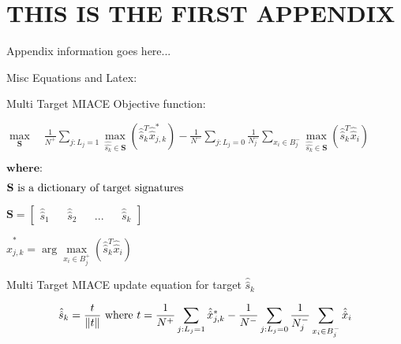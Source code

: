 
\chapter{THIS IS THE FIRST APPENDIX}

Appendix information goes here...

Misc Equations and Latex:\newline
\vspace{5mm}

\textup{Multi Target MIACE Objective function:}

$\underset{\mathbf{S}}{\max} \quad \frac{1}{N^{+}} \sum_{j:L_{j} = 1} \underset{\hat{\hat{s_{k}}}\in \mathbf{S}}\max (\hat{\hat{s}}_{k}^{T} \hat{\hat{x}}_{j,k}^{*}) - \frac{1}{N^{-}} \sum_{j:L_{j} = 0} \frac{1}{N_{j}^{-}} \sum_{x_{i} \in B_{j}^{-}} \underset{\hat{\hat{s_{k}}}\in \mathbf{S}}\max (\hat{\hat{s}}_{k}^{T} \hat{\hat{x}}_{i})$

\vspace{5mm}

$\mathbf{where:}$

$\textup{\textbf{S} is a dictionary of target signatures}$

$\mathbf{S} = 
\begin{bmatrix}
\hat{\hat{s}}_{1} && \hat{\hat{s}}_{2} && ... && \hat{\hat{s}}_{k}
\end{bmatrix}$

$\hat{\hat{x}}_{j,k}^{*} = \arg \underset{x_{i} \in B_{j}^{+}}{\max} (\hat{\hat{s}}_{k}^{T} \hat{\hat{x}}_{i})
$

\vspace{5mm}

Multi Target MIACE update equation for target $\hat{\hat{s}}_{k}$


$$\hat{\hat{s}}_{k} = \frac{t}{\left \| t \right \|} \textup{ where } t = \frac{1}{N^{+}} \sum_{j:L_{j} = 1} \hat{\hat{x}}_{j,k}^{*} - \frac{1}{N^{-}} \sum_{j:L_{j} = 0} \frac{1}{N_{j}^{-}} \sum_{x_{i} \in B_{j}^{-}} \hat{\hat{x}}_{i}$$

